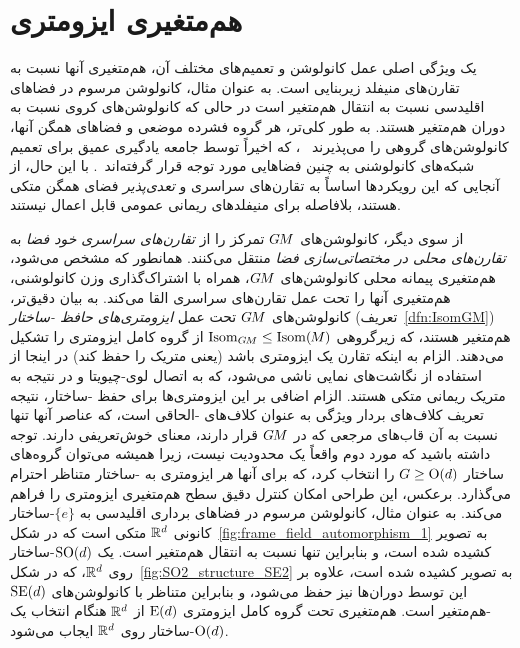 

\section{هم‌متغیری ایزومتری}
\label{sec:isometry_intro}


یک ویژگی اصلی عمل کانولوشن و تعمیم‌های مختلف آن، هم‌متغیری آنها نسبت به تقارن‌های منیفلد زیربنایی است.
به عنوان مثال، کانولوشن مرسوم در فضاهای اقلیدسی نسبت به انتقال هم‌متغیر است در حالی که کانولوشن‌های کروی نسبت به دوران هم‌متغیر هستند.
به طور کلی‌تر، هر گروه فشرده موضعی و فضاهای همگن آنها، کانولوشن‌های گروهی را می‌پذیرند
~\cite{gurarie1992symmetries,kowalski2010introduction,chirikjian2001engineering,gallier2019harmonicRepr}،
که اخیراً توسط جامعه یادگیری عمیق برای تعمیم شبکه‌های کانولوشنی به چنین فضاهایی مورد توجه قرار گرفته‌اند~\cite{Cohen2016-GCNN,Kondor2018-GENERAL,Cohen2019-generaltheory,bekkers2020bspline}.
با این حال، از آنجایی که این رویکردها اساساً به تقارن‌های سراسری و \emph{تعدی‌پذیر} فضای همگن متکی هستند، بلافاصله برای منیفلدهای ریمانی عمومی قابل اعمال نیستند.

از سوی دیگر، کانولوشن‌های $G\mkern-1.4muM$ تمرکز را از \emph{تقارن‌های سراسری خود فضا} به \emph{تقارن‌های محلی در مختصاتی‌سازی فضا} منتقل می‌کنند.
همانطور که مشخص می‌شود، هم‌متغیری پیمانه محلی کانولوشن‌های $G\mkern-1.4muM$، همراه با اشتراک‌گذاری وزن کانولوشنی، هم‌متغیری آنها را تحت عمل تقارن‌های سراسری القا می‌کند.
به بیان دقیق‌تر، کانولوشن‌های $G\mkern-1.4muM$ تحت عمل \emph{ایزومتری‌های حافظ -ساختار} (تعریف~\ref{dfn:IsomGM}) هم‌متغیر هستند، که زیرگروهی $\operatorname{Isom}_{G\mkern-1.4muM} \leq \operatorname{Isom}(\mkern-1.5mu M \mkern-.5mu)$ از گروه کامل ایزومتری را تشکیل می‌دهند.
الزام به اینکه تقارن یک ایزومتری باشد (یعنی متریک را حفظ کند) در اینجا از استفاده از نگاشت‌های نمایی ناشی می‌شود، که به اتصال لوی-چیویتا و در نتیجه به متریک ریمانی متکی هستند.
الزام اضافی بر این ایزومتری‌ها برای حفظ -ساختار، نتیجه تعریف کلاف‌های بردار ویژگی به عنوان کلاف‌های -الحاقی است، که عناصر آنها تنها نسبت به آن قاب‌های مرجعی که در $G\mkern-1.4muM$ قرار دارند، معنای خوش‌تعریفی دارند.
توجه داشته باشید که مورد دوم واقعاً یک محدودیت نیست، زیرا همیشه می‌توان گروه‌های ساختار $G\geq\operatorname{O}(d)$ را انتخاب کرد، که برای آنها \emph{هر} ایزومتری به -ساختار متناظر احترام می‌گذارد.
برعکس، این طراحی امکان کنترل دقیق سطح هم‌متغیری ایزومتری را فراهم می‌کند.
به عنوان مثال، کانولوشن مرسوم در فضاهای برداری اقلیدسی به $\{e\}$-ساختار کانونی $\mathbb{R}^d$ متکی است که در شکل~\ref{fig:frame_field_automorphism_1} به تصویر کشیده شده است، و بنابراین تنها نسبت به انتقال هم‌متغیر است.
یک $\operatorname{SO}(d)$-ساختار روی $\mathbb{R}^d$، که در شکل~\ref{fig:SO2_structure_SE2} به تصویر کشیده شده است، علاوه بر این توسط دوران‌ها نیز حفظ می‌شود، و بنابراین متناظر با کانولوشن‌های $\operatorname{SE}(d)$-هم‌متغیر است.
هم‌متغیری تحت گروه کامل ایزومتری $\operatorname{E}(d)$ از $\mathbb{R}^d$ هنگام انتخاب یک $\operatorname{O}(d)$-ساختار روی $\mathbb{R}^d$ ایجاب می‌شود.


